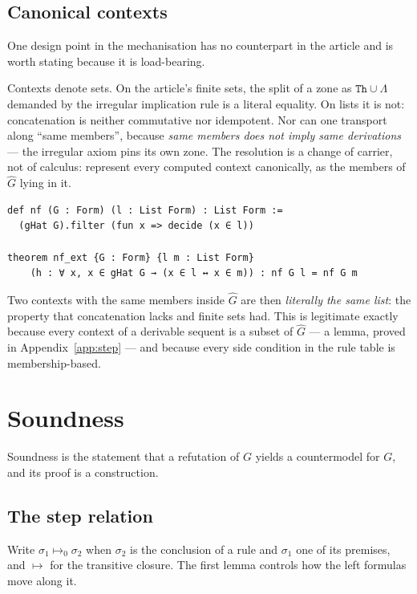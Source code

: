\documentclass[11pt,a4paper]{article}
\begin{document}
\subsection{Canonical contexts}
\label{sec:nf}

One design point in the mechanisation has no counterpart in the article
and is worth stating because it is load-bearing.

Contexts denote sets. On the article's finite sets, the split of a zone as
$\texttt{Th} \cup \Lambda$ demanded by the irregular implication rule is a
literal equality. On lists it is not: concatenation is neither commutative
nor idempotent. Nor can one transport along ``same members'', because
\emph{same members does not imply same derivations} --- the irregular
axiom pins its own zone. The resolution is a change of carrier, not of
calculus: represent every computed context canonically, as the members of
$\hat G$ lying in it.

\begin{lstlisting}
def nf (G : Form) (l : List Form) : List Form :=
  (gHat G).filter (fun x => decide (x ∈ l))

theorem nf_ext {G : Form} {l m : List Form}
    (h : ∀ x, x ∈ gHat G → (x ∈ l ↔ x ∈ m)) : nf G l = nf G m
\end{lstlisting}

\noindent
Two contexts with the same members inside $\hat G$ are then \emph{literally
the same list}: the property that concatenation lacks and finite sets had.
This is legitimate exactly because every context of a derivable sequent is
a subset of $\hat G$ --- a lemma, proved in Appendix~\ref{app:step} ---
and because every side condition in the rule table is membership-based.

\section{Soundness}
\label{sec:sound}

Soundness is the statement that a refutation of $G$ yields a countermodel
for $G$, and its proof is a construction.

\subsection{The step relation}

Write $\sigma_1 \mapsto_0 \sigma_2$ when $\sigma_2$ is the conclusion of a
rule and $\sigma_1$ one of its premises, and $\mapsto$ for the transitive
closure. The first lemma controls how the left formulas move along it.
\end{document}
